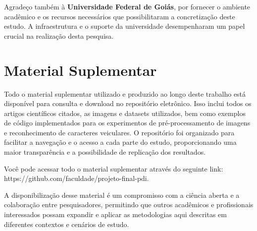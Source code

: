 \documentclass[conference]{IEEEtran}
\begin{document}
Agradeço também à \textbf{Universidade Federal de Goiás}, por fornecer o ambiente acadêmico e os recursos necessários que possibilitaram a concretização deste estudo. A infraestrutura e o suporte da universidade desempenharam um papel crucial na realização desta pesquisa.

\section{Material Suplementar}

Todo o material suplementar utilizado e produzido ao longo deste trabalho está disponível para consulta e download no repositório eletrônico. Isso inclui todos os artigos científicos citados, as imagens e datasets utilizados, bem como exemplos de código implementados para os experimentos de pré-processamento de imagens e reconhecimento de caracteres veiculares. O repositório foi organizado para facilitar a navegação e o acesso a cada parte do estudo, proporcionando uma maior transparência e a possibilidade de replicação dos resultados.

Você pode acessar todo o material suplementar através do seguinte link: https://github.com/faculdade/projeto-final-pdi.

A disponibilização desse material é um compromisso com a ciência aberta e a colaboração entre pesquisadores, permitindo que outros acadêmicos e profissionais interessados possam expandir e aplicar as metodologias aqui descritas em diferentes contextos e cenários de estudo.
\end{document}
